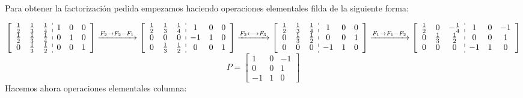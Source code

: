 \begin{enumerate}[label=\color{red}\textbf{\arabic*)}, leftmargin=*]
\begin{enumerate}[label=\color{red}\alph*)]
Para obtener la factorización pedida empezamos haciendo operaciones elementales filda de la siguiente forma:

$\left[\begin{array}{ccc:ccc}
\frac{1}{2} & \frac{1}{3} & \frac{1}{4} & 1 & 0 & 0 \\ 
\frac{1}{2} & \frac{1}{3} & \frac{1}{4} & 0 & 1 & 0 \\ 
0 & \frac{1}{3} & \frac{1}{2} & 0 & 0 & 1
\end{array} \right]\xrightarrow{F_2\to F_2-F_1}\left[\begin{array}{ccc:ccc}
\frac{1}{2} & \frac{1}{3} & \frac{1}{4} & 1 & 0 & 0 \\ 
0 & 0 & 0 & -1 & 1 & 0 \\ 
0 & \frac{1}{3} & \frac{1}{2} & 0 & 0 & 1
\end{array} \right]\xrightarrow{F_2\longleftrightarrow F_3}\left[\begin{array}{ccc:ccc}
\frac{1}{2} & \frac{1}{3} & \frac{1}{4} & 1 & 0 & 0 \\ 
0 & \frac{1}{3} & \frac{1}{2} & 0 & 0 & 1 \\ 
0 & 0 & 0 & -1 & 1 & 0
\end{array} \right]\xrightarrow{F_1\to F_1-F_2}\left[\begin{array}{ccc:ccc}
\frac{1}{2} & 0 & -\frac{1}{4} & 1 & 0 & -1 \\ 
0 & \frac{1}{3} & \frac{1}{2} & 0 & 0 & 1 \\ 
0 & 0 & 0 & -1 & 1 & 0
\end{array} \right]$\[P=\begin{bmatrix}
1 & 0 & -1 \\ 
0 & 0 & 1 \\ 
-1 & 1 & 0
\end{bmatrix} \]Hacemos ahora operaciones elementales columna:


\end{enumerate}
\end{enumerate}
